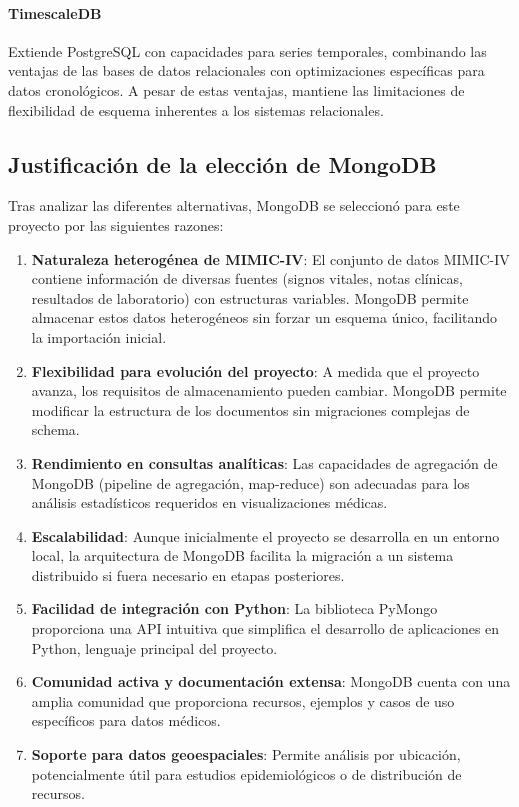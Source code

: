 \paragraph{TimescaleDB} Extiende PostgreSQL con capacidades para series temporales, combinando las ventajas de las bases de datos relacionales con optimizaciones específicas para datos cronológicos. A pesar de estas ventajas, mantiene las limitaciones de flexibilidad de esquema inherentes a los sistemas relacionales.

\subsection{Justificación de la elección de MongoDB}

Tras analizar las diferentes alternativas, MongoDB se seleccionó para este proyecto por las siguientes razones:

\begin{enumerate}
    \item \textbf{Naturaleza heterogénea de MIMIC-IV}: El conjunto de datos MIMIC-IV contiene información de diversas fuentes (signos vitales, notas clínicas, resultados de laboratorio) con estructuras variables. MongoDB permite almacenar estos datos heterogéneos sin forzar un esquema único, facilitando la importación inicial.
    
    \item \textbf{Flexibilidad para evolución del proyecto}: A medida que el proyecto avanza, los requisitos de almacenamiento pueden cambiar. MongoDB permite modificar la estructura de los documentos sin migraciones complejas de schema.
    
    \item \textbf{Rendimiento en consultas analíticas}: Las capacidades de agregación de MongoDB (pipeline de agregación, map-reduce) son adecuadas para los análisis estadísticos requeridos en visualizaciones médicas.
    
    \item \textbf{Escalabilidad}: Aunque inicialmente el proyecto se desarrolla en un entorno local, la arquitectura de MongoDB facilita la migración a un sistema distribuido si fuera necesario en etapas posteriores.
    
    \item \textbf{Facilidad de integración con Python}: La biblioteca PyMongo proporciona una API intuitiva que simplifica el desarrollo de aplicaciones en Python, lenguaje principal del proyecto.
    
    \item \textbf{Comunidad activa y documentación extensa}: MongoDB cuenta con una amplia comunidad que proporciona recursos, ejemplos y casos de uso específicos para datos médicos.
    
    \item \textbf{Soporte para datos geoespaciales}: Permite análisis por ubicación, potencialmente útil para estudios epidemiológicos o de distribución de recursos.
\end{enumerate}

